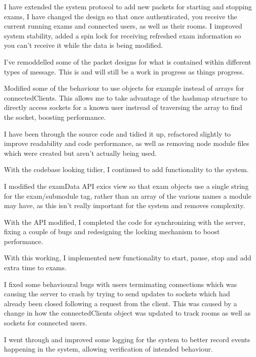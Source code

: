 \documentclass[idxtotoc,hyperref,openany]{labbook} %
\begin{document}
I have extended the system protocol to add new packets for starting and stopping exams, I have changed the design so that once authenticated, you receive the current running exams and connected users, as well as their rooms.  I improved system stability, added a spin lock for receiving refreshed exam information so you can't receive it while the data is being modified.

I've remoddelled some of the packet designs for what is contained within different types of message.  This is and will still be a work in progress as things progress.

Modified some of the behaviour to use objects for example instead of arrays for connectedClients.  This allows me to take advantage of the hashmap structure to directly access sockets for a known user instread of traversing the array to find the socket, boosting performance.



I have been through the source code and tidied it up, refactored slightly to improve readability and code performance, as well as removing node module files which were created but aren't actually being used.

With the codebase looking tidier, I continued to add functionality to the system.

I modified the examData API exics view so that exam objects use a single string for the exam/submodule tag, rather than an array of the various names a module may have, as this isn't really important for the system and removes complexity.

With the API modified, I completed the code for synchronizing with the server, fixing a couple of bugs and redesigning the locking mechanism to boost performance.

With this working, I implemented new functionality to start, pause, stop and add extra time to exams.

I fixed some behavioural bugs with users termimating connections which was causing the server to crash by trying to send updates to sockets which had already been closed following a request from the client.  This was caused by a change in how the connectedClients object was updated to track rooms as well as sockets for connected users.

I went through and improved some logging for the system to better record events happening in the system, allowing verification of intended behaviour.
\end{document}
